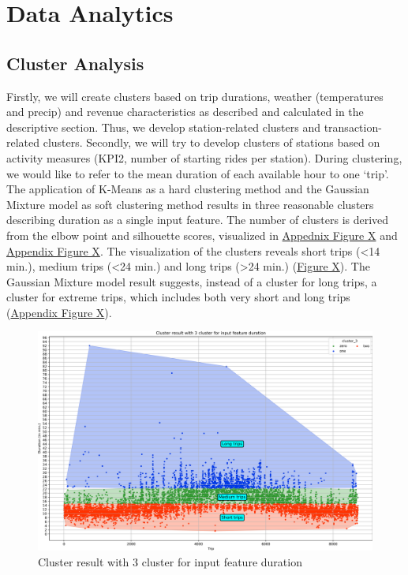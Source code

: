 
\section{Data Analytics}
\label{sec:Data Analytics}

\subsection{Cluster Analysis}
\label{subsec:clustering}
Firstly, we will create clusters based on trip durations, weather (temperatures and precip) and revenue characteristics as described and calculated in the descriptive section. Thus, we develop station-related clusters and transaction-related clusters. Secondly, we will try to develop clusters of stations based on activity measures (KPI2, number of starting rides per station).
During clustering, we would like to refer to the mean duration of each available hour to one ‘trip’. The application of K-Means as a hard clustering method and the Gaussian Mixture model as soft clustering method results in three reasonable clusters describing duration as a single input feature.  The number of clusters is derived from the elbow point and silhouette scores, visualized in \hyperref[LossKMeans_Duration_dpi300]{Appednix Figure X} and \hyperref[Silhouette_Duration]{Appendix Figure X}. The visualization of the clusters reveals short trips (<14 min.), medium trips (<24 min.) and long trips (>24 min.) (\hyperref[FINAL_Clusters_Duration]{Figure X}). The Gaussian Mixture model result suggests, instead of a cluster for long trips, a cluster for extreme trips, which includes both very short and long trips (\hyperref[FINAL_Cluster_Gaussian_Duration]{Appendix Figure X}). 

\begin{figure}[H]
   \centering
    \includegraphics[width=0.75\linewidth]{./Figures/FINAL_Clusters_Duration.png}
    \caption{Cluster result with 3 cluster for input feature duration}
    \label{FINAL_Clusters_Duration}
\end{figure}

